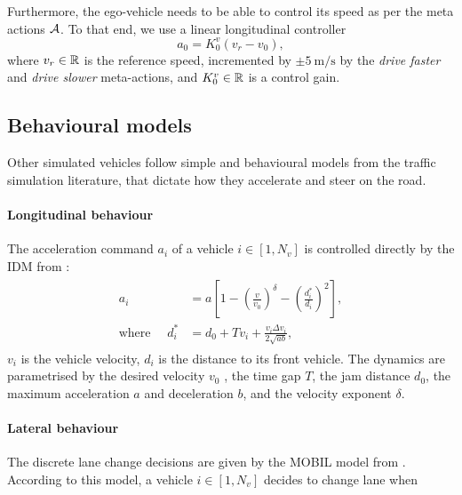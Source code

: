 Furthermore, the ego-vehicle needs to be able to control its speed as per the meta actions $\mathcal{A}$. To that end, we use a linear longitudinal controller
\begin{equation*}
a_0 = K_0^v(v_r - v_0),
\end{equation*}
where $v_r\in\mathbb{R}$ is the reference speed, incremented by $\pm \SI[per-mode=symbol]{5}{\meter\per\second}$ by the \emph{drive faster} and \emph{drive slower} meta-actions, and $K_0^v\in\mathbb{R}$ is a control gain.

\subsection{Behavioural models}

Other simulated vehicles follow simple and behavioural models from the traffic simulation literature, that dictate how they accelerate and steer on the road.

\paragraph{Longitudinal behaviour}

The acceleration command $a_i$ of a vehicle $i\in[1, N_v]$ is controlled directly by the \ac{IDM} from \citep{Treiber2000}:
\begin{align}
\begin{split}
a_i &= a\left[1-\left(\frac{v}{v_0}\right)^\delta - \left(\frac{d^*_i}{d_i}\right)^2\right], \\
\text{where }\quad d^*_i &= d_0 + Tv_i + \frac{v_i\Delta v_i}{2\sqrt{ab}},
\end{split}
\end{align}
$v_i$ is the vehicle velocity, $d_i$ is the distance to its front vehicle.
The dynamics are parametrised by the desired velocity $v_0$ , the time gap $T$, the jam distance $d_0$, the maximum acceleration $a$ and deceleration $b$, and the velocity exponent $\delta$.

\paragraph{Lateral behaviour}

The discrete lane change decisions are given by the \ac{MOBIL} model from \citep{Kesting2007}.
According to this model, a vehicle $i\in[1, N_v]$ decides to change lane when

